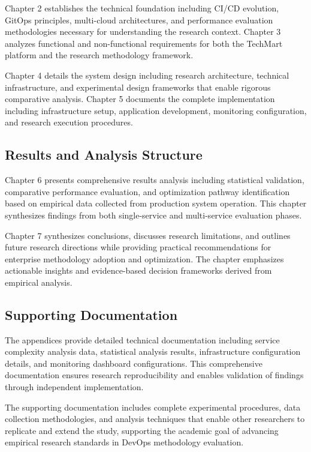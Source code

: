 Chapter 2 establishes the technical foundation including CI/CD evolution, GitOps principles, multi-cloud architectures, and performance evaluation methodologies necessary for understanding the research context. Chapter 3 analyzes functional and non-functional requirements for both the TechMart platform and the research methodology framework.

Chapter 4 details the system design including research architecture, technical infrastructure, and experimental design frameworks that enable rigorous comparative analysis. Chapter 5 documents the complete implementation including infrastructure setup, application development, monitoring configuration, and research execution procedures.

\subsection{Results and Analysis Structure}
Chapter 6 presents comprehensive results analysis including statistical validation, comparative performance evaluation, and optimization pathway identification based on empirical data collected from production system operation. This chapter synthesizes findings from both single-service and multi-service evaluation phases.

Chapter 7 synthesizes conclusions, discusses research limitations, and outlines future research directions while providing practical recommendations for enterprise methodology adoption and optimization. The chapter emphasizes actionable insights and evidence-based decision frameworks derived from empirical analysis.

\subsection{Supporting Documentation}
The appendices provide detailed technical documentation including service complexity analysis data, statistical analysis results, infrastructure configuration details, and monitoring dashboard configurations. This comprehensive documentation ensures research reproducibility and enables validation of findings through independent implementation.

The supporting documentation includes complete experimental procedures, data collection methodologies, and analysis techniques that enable other researchers to replicate and extend the study, supporting the academic goal of advancing empirical research standards in DevOps methodology evaluation.